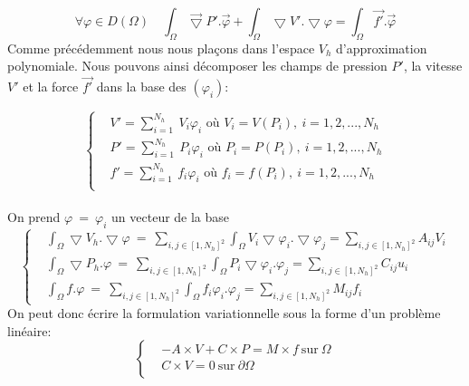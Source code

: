 \documentclass[a4paper,12pt,titlepage]{report}
\begin{document}
\begin{onehalfspace}
\[
\forall \varphi \in D(\Omega) \quad  \int_\Omega\vec{\bigtriangledown}P'. \vec \varphi + \int_{\Omega}\bigtriangledown V'. \bigtriangledown \varphi = \int_\Omega\vec{f'}. \vec \varphi
\]
Comme précédemment nous nous plaçons dans l'espace $V_{h}$ d'approximation polynomiale.
Nous pouvons ainsi décomposer les champs de pression $P'$, la vitesse $V'$ et la force $\vec{f'}$ dans la base des $(\varphi_{i})$:

\begin{equation*}
  \left\{
    \begin{aligned}
 &V '= \sum_{i=1}^{N_{h}}{\ V_{i}\varphi_{i}} \text{ \ \ où } V_{i} = V(P_{i}),\  i= 1,2,...,N_{h}\\
 &P '= \sum_{i=1}^{N_{h}}{\ P_{i}\varphi_{i}} \text{ \ \ où } P_{i} = P(P_{i}),\  i= 1,2,...,N_{h}\\
 &f' = \sum_{i=1}^{N_{h}}{\ f_{i}\varphi_{i}} \text{ \ \ où } f_{i} = f(P_{i}),\  i= 1,2,...,N_{h}\\
\end{aligned}
  \right.
\end{equation*}$ $ \\ 
On prend $\varphi\ =\ \varphi_{i}$ un vecteur de la base
\begin{equation*}
  \left\{
    \begin{aligned}
	&\int_{\Omega}\bigtriangledown V_{h}.\bigtriangledown \varphi\ 
	=\ 
	\sum_{i, j \in [1, N_{h}]^{2}} \int_{\Omega}V_{i}\bigtriangledown\varphi_{i}. \bigtriangledown\varphi_{j} 
	= 
	\sum_{i,j \in [1, N_{h}]^{2}} A_{ij} V_{i}\\
	&\int_{\Omega}\bigtriangledown P_{h}.\varphi\ 
	=\ 
	\sum_{i, j \in [1, N_{h}]^{2}} \int_{\Omega}P_{i}\bigtriangledown\varphi_{i}. \varphi_{j} 
	= 
	\sum_{i,j \in [1, N_{h}]^{2}}C_{ij} u_{i}\\
	&\int_{\Omega} f. \varphi\ 
	=\ 
	\sum_{i, j \in [1, N_{h}]^{2}} \int_{\Omega}f_{i}\varphi_{i}. \varphi_{j} 
	= 
	\sum_{i,j \in [1, N_{h}]^{2}} M_{ij} f_{i}\end{aligned}
  \right.
\end{equation*}
On peut donc écrire la formulation variationnelle sous la forme d'un problème linéaire:
\begin{equation*}
  \left\{
    \begin{aligned}
	&-A\times V + C \times P = M	\times f \ \text{sur} \ \Omega\\
	& C\times V = 0 \ \text{sur} \  \partial\Omega\\
	\end{aligned}
  \right.
\end{equation*}


\end{onehalfspace}
\end{document}
